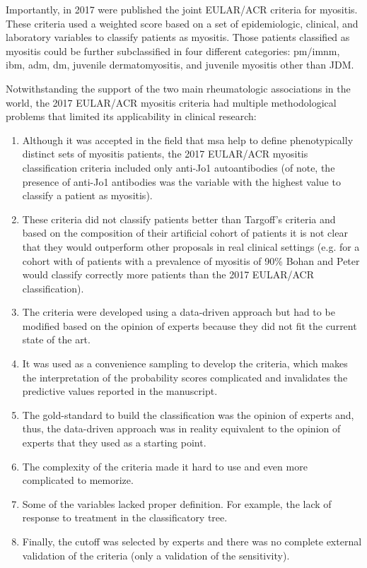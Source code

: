 Importantly, in 2017 were published the joint EULAR/ACR criteria for myositis.\cite{Lundberg2017} These criteria used a weighted score based on a set of epidemiologic, clinical, and laboratory variables to classify patients as myositis. Those patients classified as myositis could be further subclassified in four different categories: \gls{pm}/\gls{imnm}, \gls{ibm}, \gls{adm}, \gls{dm}, juvenile dermatomyositis, and juvenile myositis other than JDM.\cite{Lundberg2017}

Notwithstanding the support of the two main rheumatologic associations in the world, the 2017 EULAR/ACR myositis criteria had multiple methodological problems that limited its applicability in clinical research:

\begin{enumerate}
	\item Although it was accepted in the field that \gls{msa} help to define phenotypically distinct sets of myositis patients, the 2017 EULAR/ACR myositis classification criteria included only anti-Jo1 autoantibodies (of note, the presence of anti-Jo1 antibodies was the variable with the highest value to classify a patient as myositis).
	
	\item These criteria did not classify patients better than Targoff's criteria and based on the composition of their artificial cohort of patients it is not clear that they would outperform other proposals in real clinical settings (e.g. for a cohort with of patients with a prevalence of myositis of 90\% Bohan and Peter would classify correctly more patients than the 2017 EULAR/ACR classification).
	
	\item The criteria were developed using a data-driven approach but had to be modified based on the opinion of experts because they did not fit the current state of the art.
	
	\item It was used as a convenience sampling to develop the criteria, which makes the interpretation of the probability scores complicated and invalidates the predictive values reported in the manuscript.
	
	\item The gold-standard to build the classification was the opinion of experts and, thus, the data-driven approach was in reality equivalent to the opinion of experts that they used as a starting point.
	
	\item The complexity of the criteria made it hard to use and even more complicated to memorize.
	
	\item Some of the variables lacked proper definition. For example, the lack of response to treatment in the classificatory tree.
	
	\item Finally, the cutoff was selected by experts and there was no complete external validation of the criteria (only a validation of the sensitivity).
\end{enumerate}

